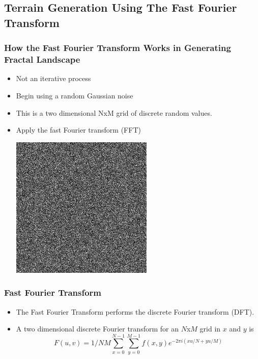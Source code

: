 \documentclass{beamer}
\begin{document}
\subsection{Terrain Generation Using The Fast Fourier Transform}

\begin{frame}
 \frametitle{How the Fast Fourier Transform Works in Generating Fractal Landscape}
\begin{itemize}
\item Not an iterative process
\item Begin using a random Gaussian noise
\item This is a two dimensional NxM grid of discrete random values. 
\item Apply the fast Fourier transform (FFT)
\begin{center}
\includegraphics[scale=0.3]{fft2d.jpg}
\end{center}
\end{itemize}
\end{frame}

\begin{frame}
\frametitle{Fast Fourier Transform}
\begin{itemize}
\item The Fast Fourier Transform performs the discrete Fourier transform (DFT). 
\item A two dimensional discrete Fourier transform for an $N$x$M$ grid in $x$ and $y$ is 
	$$F(u,v)=1/NM\displaystyle\sum\limits_{x=0}^{N-1} \displaystyle\sum\limits_{y=0}^{M-1} f(x,y)e^{-2\pi i(xu/N+yu/M)}$$
\end{itemize}
\end{frame}
\end{document}

